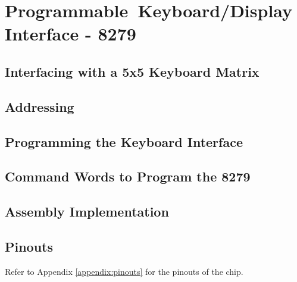 \section{Programmable Keyboard/Display Interface - 8279}

    \subsection{Interfacing with a 5x5 Keyboard Matrix}

    \subsection{Addressing}

    \subsection{Programming the Keyboard Interface}

    \subsection{Command Words to Program the 8279}

    \subsection{Assembly Implementation}

    \subsection{Pinouts}
    Refer to Appendix \ref{appendix:pinouts} for the pinouts of the chip.
